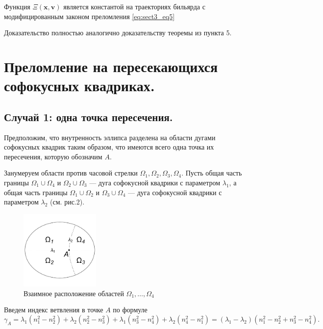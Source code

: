 \begin{theorem}
Функция $\Xi(\mathbf{x}, \mathbf{v})$ является константой на траекториях бильярда с модифицированным законом  преломления \eqref{eq:sect3_eq5}
\end{theorem}
Доказательство полностью аналогично доказательству теоремы из пункта 5.



\section{Преломление на пересекающихся софокусных квадриках.}

\subsection{ Случай 1: одна точка пересечения. }

Предположим, что внутренность эллипса разделена на области дугами софокусных квадрик таким образом, что имеются всего одна точка их пересечения, которую обозначим $A$.

Занумеруем области против часовой стрелки $\Omega_1, \Omega_2, \Omega_3, \Omega_4$. Пусть общая часть границы $\Omega_1 \cup \Omega_4$ и $\Omega_2 \cup \Omega_3$ --- дуга софокусной квадрики с параметром $\lambda_1$, а общая часть границы $\Omega_1 \cup \Omega_2$ и $\Omega_3 \cup \Omega_4$ --- дуга софокусной квадрики с параметром $\lambda_2$ (см. рис.2).

\begin{figure}[ht]
    \begin{minipage}[b][][b]{\linewidth}\centering
        \includegraphics[width=0.35\textwidth]{images/ch3/img2.pdf}
    \end{minipage}
\caption{Взаимное расположение областей $\Omega_1,\ldots,\Omega_4$}
\end{figure}

Введем индекс ветвления в точке $A$ по формуле $$\gamma_A = \lambda_1(n_1^2 - n_2^2) + \lambda_2(n_2^2-n_3^2) + \lambda_1(n_3^2-n_4^2) + \lambda_2(n_4^2-n_1^2) = (\lambda_1 - \lambda_2) ( n_1^2 - n_2^2 + n_3^2 - n_4^2).$$

